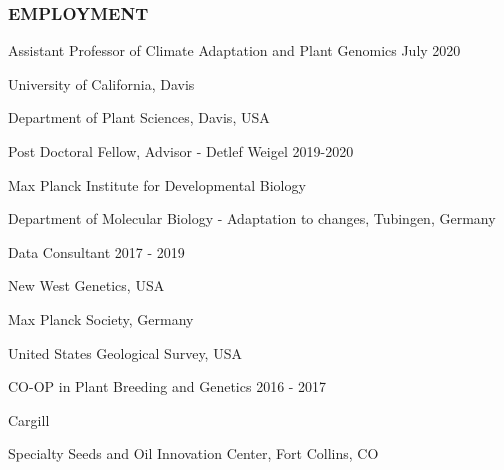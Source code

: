 \documentclass[12pt,english]{article}
\begin{document}

\subsubsection*{EMPLOYMENT}
\vspace{-0.5ex}\par

\hspace{1.0em} Assistant Professor of Climate Adaptation and Plant Genomics
\hfill
July 2020
\vspace{-0.5ex}\par
\hspace{2.0em} University of California, Davis
\vspace{-0.5ex}\par
\hspace{2.0em} Department of Plant Sciences, Davis, USA
\hfill
\vspace{0.5em}\par

\hspace{1.0em} Post Doctoral Fellow, Advisor - Detlef Weigel
\hfill
2019-2020
\vspace{-0.5ex}\par
\hspace{2.0em} Max Planck Institute for Developmental Biology
\vspace{-0.5ex}\par
\hspace{2.0em} Department of Molecular Biology - Adaptation to changes, Tubingen, Germany
\hfill
\vspace{0.5em}\par

\hspace{1.0em} Data Consultant 
\hfill
2017 - 2019
\vspace{-0.5ex}\par
\hspace{2.0em} New West Genetics, USA
\vspace{-0.5ex}\par
\hspace{2.0em} Max Planck Society, Germany
\vspace{-0.5ex}\par
\hspace{2.0em} United States Geological Survey, USA
\hfill
\vspace{0.5em}\par

\hspace{1.0em} CO-OP in Plant Breeding and Genetics
\hfill
2016 - 2017
\vspace{-0.5ex}\par
\hspace{2.0em} Cargill
\vspace{-0.5ex}\par
\hspace{2.0em} Specialty Seeds and Oil Innovation Center, Fort Collins, CO
\vspace{0.5em}\par
\end{document}
